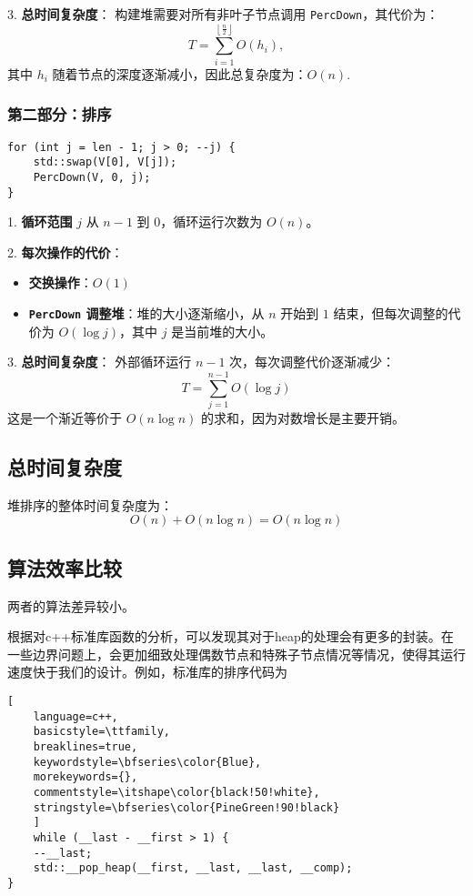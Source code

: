\documentclass[UTF8]{ctexart}
\begin{document}
3. \textbf{总时间复杂度}：
构建堆需要对所有非叶子节点调用 \texttt{PercDown}，其代价为：
\[
T = \sum_{i=1}^{\left\lfloor \frac{n}{2} \right\rfloor} O(h_i),
\]
其中 \( h_i \) 随着节点的深度逐渐减小，因此总复杂度为：$O(n)$.

\subsubsection*{第二部分：排序}
\begin{verbatim}
for (int j = len - 1; j > 0; --j) {
    std::swap(V[0], V[j]);
    PercDown(V, 0, j);
}
\end{verbatim}

1. \textbf{循环范围}
$j$ 从 $n- 1$ 到 $0$，循环运行次数为 \( O(n) \)。

2. \textbf{每次操作的代价}：
\begin{itemize}
    \item \textbf{交换操作}：\( O(1) \)
    \item \textbf{\texttt{PercDown} 调整堆}：堆的大小逐渐缩小，从 \( n \) 开始到 \( 1 \) 结束，但每次调整的代价为 \( O(\log j) \)，其中 \( j \) 是当前堆的大小。
\end{itemize}

3. \textbf{总时间复杂度}：
外部循环运行 \( n-1 \) 次，每次调整代价逐渐减少：
\[
T = \sum_{j=1}^{n-1} O(\log j)
\]
这是一个渐近等价于 \( O(n \log n) \) 的求和，因为对数增长是主要开销。

\subsection*{总时间复杂度}
堆排序的整体时间复杂度为：
\[
O(n) + O(n \log n) = O(n \log n)
\]

\subsection{算法效率比较}
两者的算法差异较小。

根据对c++标准库函数的分析，可以发现其对于heap的处理会有更多的封装。在一些边界问题上，会更加细致处理偶数节点和特殊子节点情况等情况，使得其运行速度快于我们的设计。例如，标准库的排序代码为

\begin{lstlisting}[ 
    language=c++,
    basicstyle=\ttfamily,
    breaklines=true,
    keywordstyle=\bfseries\color{Blue}, 
    morekeywords={}, 
    commentstyle=\itshape\color{black!50!white},
    stringstyle=\bfseries\color{PineGreen!90!black} 
    ]
    while (__last - __first > 1) {
    --__last;
    std::__pop_heap(__first, __last, __last, __comp);
}
\end{lstlisting}
\end{document}
